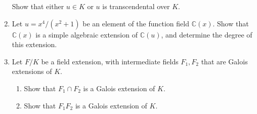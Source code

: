 \documentclass[12pt]{article}
\newcommand{\CC}{{\mathbb C}}
\begin{document}
\begin{enumerate}
  Show that either $u\in K$ or $u$ is transcendental over $K$.
\vspace{-2pt}

\item   Let $u=x^4/(x^2+1)$ be an element of the function field $\CC(x)$.
  Show that $\CC(x)$ is a simple algebraic extension of $\CC(u)$, and determine the degree of this extension.
\vspace{-2pt}

\item   Let $F/K$ be a field extension, with intermediate fields $F_1,F_2$ that are Galois extensions of $K$.
  \begin{enumerate}
  \item Show that $F_1\cap F_2$ is a Galois extension of $K$.

  \item  Show that $F_1F_2$ is a Galois extension of $K$.

  \end{enumerate}
  \vspace{-2pt}
  

\end{enumerate}
\end{document}
